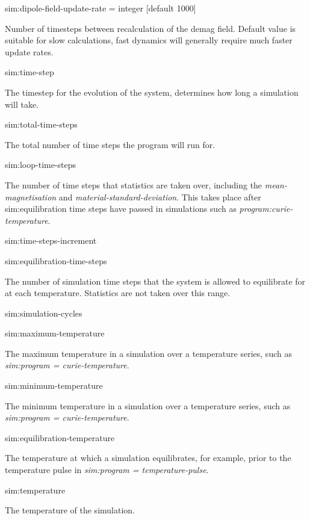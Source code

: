 {\zicf sim:dipole-field-update-rate = integer [default 1000]}
Number of timesteps between recalculation of the demag field. Default value is suitable for slow calculations, fast dynamics will generally require much faster update rates.

{\zicf sim:time-step} The timestep for the evolution of the system, determines how long a simulation will take.

{\zicf sim:total-time-steps} The total number of time steps the program will run for.

{\zicf sim:loop-time-steps} The number of time steps that statistics are taken over, including the \textit{mean-magnetisation} and \textit{material-standard-deviation}. This takes place after sim:equilibration time steps have passed in simulations such as \textit{program:curie-temperature}.

{\zicf sim:time-steps-increment}

{\zicf sim:equilibration-time-steps} The number of simulation time steps that the system is allowed to equilibrate for at each temperature. Statistics are not taken over this range.

{\zicf sim:simulation-cycles}

{\zicf sim:maximum-temperature} The maximum temperature in a simulation over a temperature series, such as \textit{sim:program = curie-temperature}.

{\zicf sim:minimum-temperature} The minimum temperature in a simulation over a temperature series, such as \textit{sim:program = curie-temperature}.

{\zicf sim:equilibration-temperature} The temperature at which a simulation equilibrates, for example, prior to the temperature pulse in \textit{sim:program = temperature-pulse}.

{\zicf sim:temperature} The temperature of the simulation.

